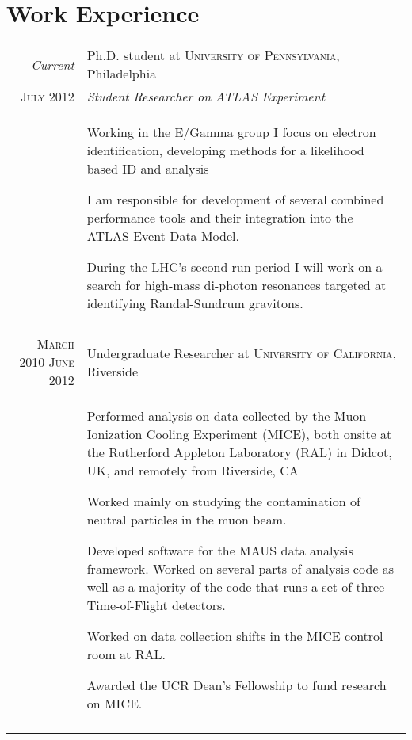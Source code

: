 \documentclass[a4paper,10pt]{article} %
\begin{document}

\section{Work Experience}

\begin{tabular}{r|p{11cm}}
\emph{Current}    & Ph.D. student at \textsc{University of Pennsylvania}, Philadelphia \\
\textsc{July 2012} & \emph{Student Researcher on ATLAS Experiment}\\ 
				   & \begin{itemize}
					 \footnotesize{
						\item Working in the E/Gamma group I focus on electron identification, developing methods for a likelihood based ID and analysis
						\item I am responsible for development of several combined performance tools and their integration into the ATLAS Event Data Model.
						\item During the LHC's second run period I will work on a search for high-mass di-photon resonances targeted at identifying Randal-Sundrum gravitons. 
					 }
					 \end{itemize} \\
\multicolumn{2}{c}{} \\


\textsc{March 2010-June 2012} & Undergraduate Researcher at \textsc{University of California}, Riverside \emph{}\\
				  & \begin{itemize}
					\footnotesize{
						\item Performed analysis on data collected by the Muon Ionization Cooling Experiment (MICE), both onsite at the Rutherford Appleton Laboratory (RAL) in Didcot, UK, and remotely from Riverside, CA
						\item Worked mainly on studying the contamination of neutral particles in the muon beam.
					    \item Developed software for the MAUS data analysis framework.  Worked on several parts of analysis code as well as a majority of the code that runs a set of three Time-of-Flight detectors.
						\item Worked on data collection shifts in the MICE control room at RAL.
						\item Awarded the UCR Dean’s Fellowship to fund research on MICE.
					}
			        \end{itemize} \\
\multicolumn{2}{c}{} \\


\end{tabular}
\end{document}
